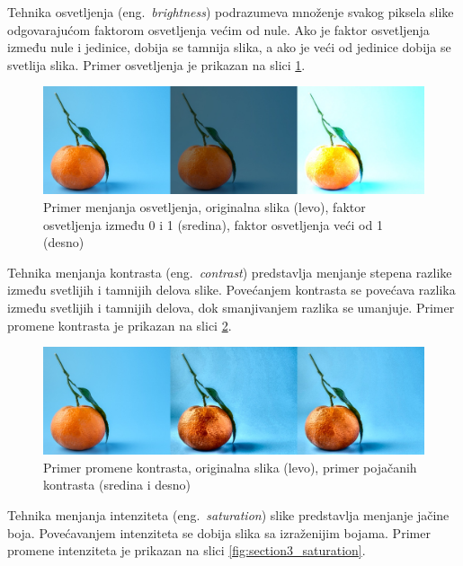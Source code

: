 \documentclass[12pt,oneside]{memoir}
\begin{document}
Tehnika osvetljenja (eng.~\textit{brightness}) podrazumeva množenje svakog piksela slike odgovarajućom faktorom osvetljenja većim od nule. Ako je faktor osvetljenja između nule i jedinice, dobija se tamnija slika, a ako je veći od jedinice dobija se svetlija slika. Primer osvetljenja je prikazan na slici \ref{fig:section3_brightness}.

\begin{figure}[ht]
    \centering
    \includegraphics[width=1\textwidth]{matfmaster/glava3/brightness.jpg}
    \caption{Primer menjanja osvetljenja, originalna slika (levo), faktor osvetljenja između 0 i 1 (sredina), faktor osvetljenja veći od 1 (desno) \cite{unsplashOrange}} 
    \label{fig:section3_brightness}
\end{figure}


Tehnika menjanja kontrasta (eng.~\textit{contrast}) predstavlja menjanje stepena razlike između svetlijih i tamnijih delova slike. Povećanjem kontrasta se povećava razlika između svetlijih i tamnijih delova, dok smanjivanjem razlika se umanjuje. Primer promene kontrasta je prikazan na slici \ref{fig:section3_contrast}.

\begin{figure}[ht]
    \centering
    \includegraphics[width=1\textwidth]{matfmaster/glava3/contrast.jpg}
    \caption{Primer promene kontrasta, originalna slika (levo), primer pojačanih kontrasta (sredina i desno) \cite{unsplashOrange}} 
    \label{fig:section3_contrast}
\end{figure}


Tehnika menjanja intenziteta (eng.~\textit{saturation}) slike predstavlja menjanje jačine boja. Povećavanjem intenziteta se dobija slika sa izraženijim bojama. Primer promene intenziteta je prikazan na slici \ref{fig:section3_saturation}.
\end{document}

